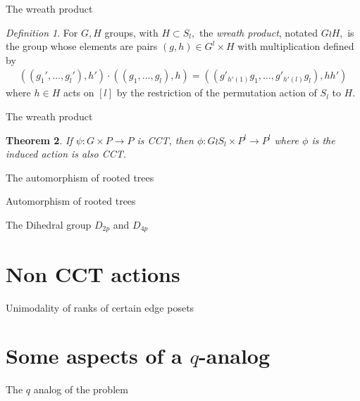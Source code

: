 \documentclass{beamer}
\newtheorem{thm}{Theorem}
\theoremstyle{remark}
\newtheorem{defn}[thm]{Definition}
\begin{document}
\begin{frame}{The wreath product}
\begin{defn}
For $G, H$ groups, with $H \subset S_l,$ the {\it wreath product}, notated $G \wr H,$ is the group whose elements are pairs $(g,h) \in G^l\times H$ with multiplication defined by
\begin{align*}
((g_1',\ldots, g_l'),h') \cdot ((g_1,\ldots, g_l) ,h) =((g'_{h'(1)}g_1,\ldots, g'_{h'(l)}g_l),hh')
\end{align*}
where $h \in H$ acts on $[l]$ by the restriction of the permutation action of $S_l$ to $H.$
\end{defn}
\end{frame}



\begin{frame}{The wreath product}
\begin{thm}
\label{thm:wreath_preservation}
If $\psi:G\times P \rightarrow P$ is CCT, then $\phi:G\wr S_l \times P^l \rightarrow P^l$ where $\phi$ is the induced action is also CCT.
\end{thm}
\end{frame}



\begin{frame}{The automorphism of rooted trees}

\end{frame}





\begin{frame}{Automorphism of rooted trees}

\end{frame}






\begin{frame}{The Dihedral group $D_{2p}$ and $D_{4p}$}

\end{frame}







\section{Non CCT actions}
\begin{frame}{Unimodality of ranks of certain edge posets}


\end{frame}





\section{Some aspects of a $q$-analog}
\begin{frame}{The $q$ analog of the problem}

\end{frame}
\end{document}
